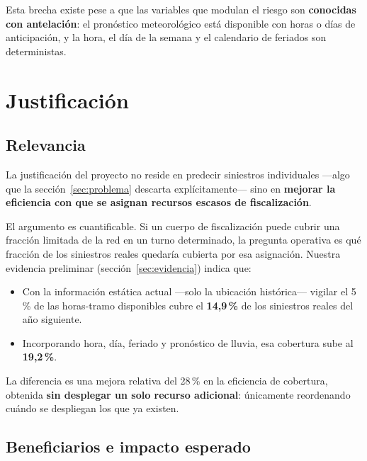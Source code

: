\documentclass[11pt,a4paper]{article}
\begin{document}
Esta brecha existe pese a que las variables que modulan el riesgo son
\textbf{conocidas con antelación}: el pronóstico meteorológico está disponible
con horas o días de anticipación, y la hora, el día de la semana y el calendario
de feriados son deterministas.

\section{Justificación}

\subsection{Relevancia}

La justificación del proyecto no reside en predecir siniestros individuales
---algo que la sección~\ref{sec:problema} descarta explícitamente--- sino en
\textbf{mejorar la eficiencia con que se asignan recursos escasos de
fiscalización}.

El argumento es cuantificable. Si un cuerpo de fiscalización puede cubrir una
fracción limitada de la red en un turno determinado, la pregunta operativa es
qué fracción de los siniestros reales quedaría cubierta por esa asignación.
Nuestra evidencia preliminar (sección~\ref{sec:evidencia}) indica que:

\begin{itemize}
  \item Con la información estática actual ---solo la ubicación histórica---
  vigilar el 5\,\% de las horas-tramo disponibles cubre el \textbf{14,9\,\%} de
  los siniestros reales del año siguiente.
  \item Incorporando hora, día, feriado y pronóstico de lluvia, esa cobertura
  sube al \textbf{19,2\,\%}.
\end{itemize}

La diferencia es una mejora relativa del 28\,\% en la eficiencia de cobertura,
obtenida \textbf{sin desplegar un solo recurso adicional}: únicamente
reordenando cuándo se despliegan los que ya existen.

\subsection{Beneficiarios e impacto esperado}
\end{document}
